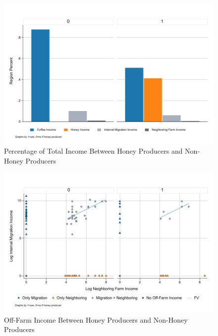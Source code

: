 \documentclass[../main.tex]{subfiles}
\begin{document}

\begin{figure}[h!]
    \centering
    \caption{Percentage of Total Income Between Honey Producers and Non-Honey Producers}
    \label{fig:graph_income_sources}    \includegraphics[width=.9\textwidth]{project/figures/pdf/graph_income_sources.pdf}
\end{figure}

\begin{figure}[h!]
    \centering
    \caption{Off-Farm Income Between Honey Producers and Non-Honey Producers}
    \label{fig:graph_income_other}    \includegraphics[width=.9\textwidth]{project/figures/pdf/graph_income_other.pdf}
\end{figure}
\end{document}

